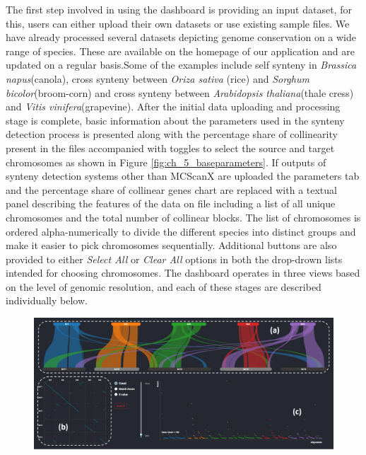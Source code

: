 The first step involved in using the dashboard is providing an input dataset, for this, users can either upload their own datasets or use existing sample files. We have already processed several datasets depicting genome conservation on a wide range of species. These are available on the homepage of our application and are updated on a regular basis.Some of the examples include self synteny in \textit{Brassica napus}(canola), cross synteny between \textit{Oriza sativa} (rice) and \textit{Sorghum bicolor}(broom-corn) and cross synteny between \textit{Arabidopsis thaliana}(thale cress) and \textit{Vitis vinifera}(grapevine). After the initial data uploading and processing stage is complete, basic information about the parameters used in the synteny detection process is presented along with the percentage share of collinearity present in the files accompanied with toggles to select the source and target chromosomes as shown in Figure \ref{fig:ch_5_baseparameters}. If outputs of synteny detection systems other than MCScanX are uploaded the parameters tab and the percentage share of collinear genes chart are replaced with a textual panel describing the features of the data on file including a list of all unique chromosomes and the total number of collinear blocks. The list of chromosomes is ordered alpha-numerically to divide the different species into distinct groups and make it easier to pick chromosomes sequentially. Additional buttons are also provided to either \textit{Select All} or \textit{Clear All} options in both the drop-drown lists intended for choosing chromosomes. The dashboard operates in three views based on the level of genomic resolution, and each of these stages are described individually below.

\begin{figure}
  \centering
  \includegraphics[width=.95\linewidth]{images/ch_1_dashboard.PNG}
  \label{fig:ch_4_dashboard}
\end{figure} 

